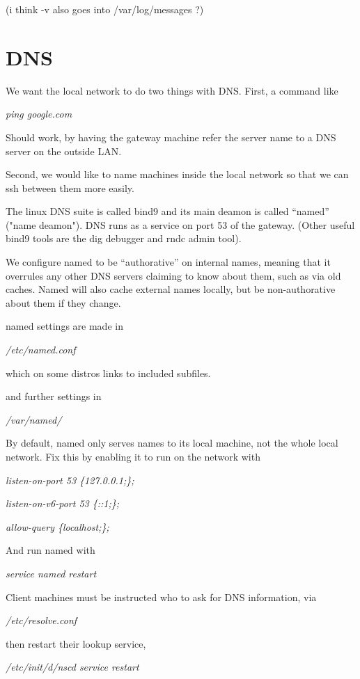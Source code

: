 \documentclass[oneside,english]{scrbook}
\begin{document}
(i think -v also goes into /var/log/messages ?)



\section{DNS}

We want the local network to do two things with DNS. First, a command
like

\emph{ping google.com}

Should work, by having the gateway machine refer the server name to
a DNS server on the outside LAN.

Second, we would like to name machines inside the local network so
that we can ssh between them more easily.

The linux DNS suite is called bind9 and its main deamon is called
``named'' ("name deamon"). DNS runs as a service on port 53 of the gateway. (Other
useful bind9 tools are the dig debugger and rndc admin tool).

We configure named to be ``authorative'' on internal names, meaning
that it overrules any other DNS servers claiming to know about them,
such as via old caches. Named will also cache external names locally,
but be non-authorative about them if they change.

named settings are made in

\emph{/etc/named.conf}

which on some distros links to included subfiles.

and further settings in

\emph{/var/named/}

By default, named only serves names to its local machine, not the
whole local network. Fix this by enabling it to run on the network
with

\emph{listen-on-port 53 \{127.0.0.1;\}; }

\emph{listen-on-v6-port 53 \{::1;\}; }

\emph{allow-query \{localhost;\};}

And run named with

\emph{service named restart}

Client machines must be instructed who to ask for DNS information,
via 

\emph{/etc/resolve.conf}

then restart their lookup service,

\emph{/etc/init/d/nscd service restart}
\end{document}
